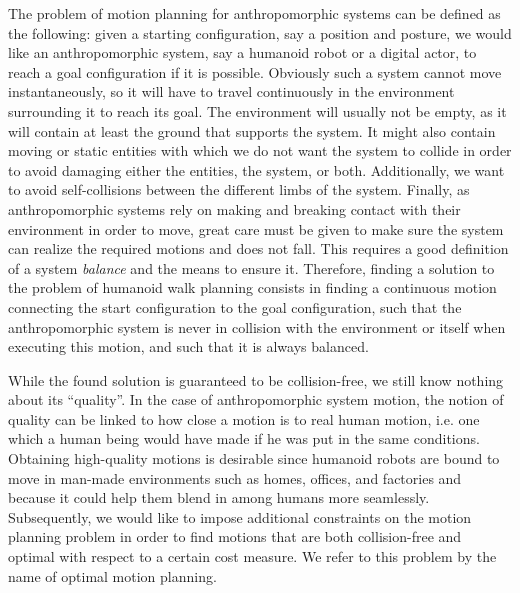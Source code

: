 The problem of motion planning for anthropomorphic systems can be
defined as the following: given a starting configuration, say a
position and posture, we would like an anthropomorphic system, say a
humanoid robot or a digital actor, to reach a goal configuration if it
is possible. Obviously such a system cannot move instantaneously, so
it will have to travel continuously in the environment surrounding it
to reach its goal. The environment will usually not be empty, as it
will contain at least the ground that supports the system. It might
also contain moving or static entities with which we do not want the
system to collide in order to avoid damaging either the entities, the
system, or both. Additionally, we want to avoid self-collisions
between the different limbs of the system. Finally, as anthropomorphic
systems rely on making and breaking contact with their environment in
order to move, great care must be given to make sure the system can
realize the required motions and does not fall. This requires a good
definition of a system \emph{balance} and the means to ensure
it. Therefore, finding a solution to the problem of humanoid walk
planning consists in finding a continuous motion connecting the start
configuration to the goal configuration, such that the anthropomorphic
system is never in collision with the environment or itself when
executing this motion, and such that it is always balanced.

While the found solution is guaranteed to be collision-free, we still
know nothing about its ``quality''. In the case of anthropomorphic
system motion, the notion of quality can be linked to how close a
motion is to real human motion, i.e. one which a human being would
have made if he was put in the same conditions. Obtaining high-quality
motions is desirable since humanoid robots are bound to move in
man-made environments such as homes, offices, and factories and
because it could help them blend in among humans more
seamlessly. Subsequently, we would like to impose additional
constraints on the motion planning problem in order to find motions
that are both collision-free and optimal with respect to a certain
cost measure. We refer to this problem by the name of optimal motion
planning.

